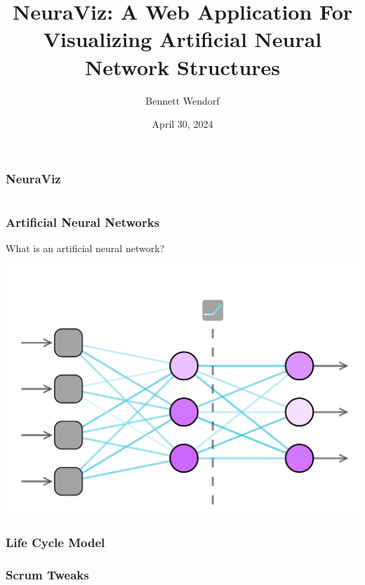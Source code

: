 \documentclass{beamer}
\title{NeuraViz: A Web Application For Visualizing Artificial Neural Network Structures}
\author{Bennett Wendorf}
\institute{University of Wisconsin - La Crosse}
\date{April 30, 2024}
\begin{document}
 
\frame{\titlepage}


\begin{frame}
    \frametitle{NeuraViz}
    \begin{columns}
        \begin{column}{0.5\textwidth}

        \end{column}
        \begin{column}{0.5\textwidth}
            
        \end{column}
    \end{columns}
\end{frame}

\begin{frame}
    \frametitle{Artificial Neural Networks}
    \begin{block}{}
        What is an artificial neural network?
    \end{block}
    \pause
    \centering
    \includegraphics[scale=0.18]{../01_introduction/res/neural_network.png}
\end{frame}
    
\begin{frame}
    \frametitle{Life Cycle Model}
\end{frame}
 
\begin{frame}
    \frametitle{Scrum Tweaks} 
\end{frame}
\end{document}
